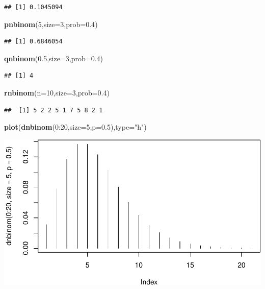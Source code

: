 \documentclass[]{article}
\newenvironment{Shaded}{\begin{snugshade}}{\end{snugshade}}
\newcommand{\KeywordTok}[1]{\textcolor[rgb]{0.13,0.29,0.53}{\textbf{{#1}}}}
\newcommand{\DataTypeTok}[1]{\textcolor[rgb]{0.13,0.29,0.53}{{#1}}}
\newcommand{\DecValTok}[1]{\textcolor[rgb]{0.00,0.00,0.81}{{#1}}}
\newcommand{\FloatTok}[1]{\textcolor[rgb]{0.00,0.00,0.81}{{#1}}}
\newcommand{\StringTok}[1]{\textcolor[rgb]{0.31,0.60,0.02}{{#1}}}
\newcommand{\NormalTok}[1]{{#1}}
\begin{document}
\begin{verbatim}
## [1] 0.1045094
\end{verbatim}

\begin{Shaded}
\begin{Highlighting}[]
\KeywordTok{pnbinom}\NormalTok{(}\DecValTok{5}\NormalTok{,}\DataTypeTok{size=}\DecValTok{3}\NormalTok{,}\DataTypeTok{prob=}\FloatTok{0.4}\NormalTok{)}
\end{Highlighting}
\end{Shaded}

\begin{verbatim}
## [1] 0.6846054
\end{verbatim}

\begin{Shaded}
\begin{Highlighting}[]
\KeywordTok{qnbinom}\NormalTok{(}\FloatTok{0.5}\NormalTok{,}\DataTypeTok{size=}\DecValTok{3}\NormalTok{,}\DataTypeTok{prob=}\FloatTok{0.4}\NormalTok{)}
\end{Highlighting}
\end{Shaded}

\begin{verbatim}
## [1] 4
\end{verbatim}

\begin{Shaded}
\begin{Highlighting}[]
\KeywordTok{rnbinom}\NormalTok{(}\DataTypeTok{n=}\DecValTok{10}\NormalTok{,}\DataTypeTok{size=}\DecValTok{3}\NormalTok{,}\DataTypeTok{prob=}\FloatTok{0.4}\NormalTok{)}
\end{Highlighting}
\end{Shaded}

\begin{verbatim}
##  [1] 5 2 2 5 1 7 5 8 2 1
\end{verbatim}

\begin{Shaded}
\begin{Highlighting}[]
\KeywordTok{plot}\NormalTok{(}\KeywordTok{dnbinom}\NormalTok{(}\DecValTok{0}\NormalTok{:}\DecValTok{20}\NormalTok{,}\DataTypeTok{size=}\DecValTok{5}\NormalTok{,}\DataTypeTok{p=}\FloatTok{0.5}\NormalTok{),}\DataTypeTok{type=}\StringTok{"h"}\NormalTok{)}
\end{Highlighting}
\end{Shaded}

\includegraphics{probability_files/figure-latex/unnamed-chunk-14-1.pdf}
\end{document}
